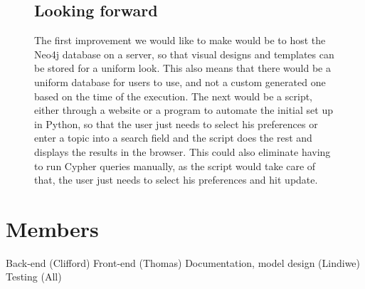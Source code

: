 \documentclass[11pt]{article}
\begin{document}
\begin{figure}
\subsection{Looking forward}
The first improvement we would like to make would be to host the Neo4j database on a server, so that visual designs and templates can be stored for a uniform look. This also means that there would be a uniform database for users to use, and not a custom generated one based on the time of the execution. The next would be a script, either through a website or a program to automate the initial set up in Python, so that the user just needs to select his preferences or enter a topic into a search field and the script does the rest and displays the results in the browser. This could also eliminate having to run Cypher queries manually, as the script would take care of that, the user just needs to select his preferences and hit update.
\end{figure}
\newpage
\section{Members}
Back-end (Clifford)\newline
Front-end (Thomas)\newline
Documentation, model design (Lindiwe)\newline
Testing (All)
\end{document}
